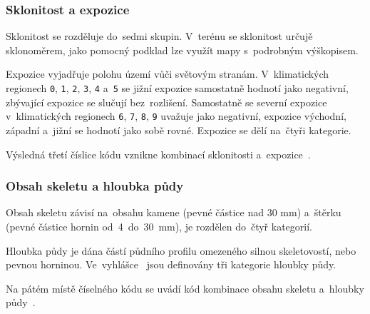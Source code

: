 \subsubsection{Sklonitost a expozice}
\label{sklonitost_expozice}

Sklonitost se rozděluje do~sedmi skupin. V~terénu se sklonitost určujě sklonoměrem, jako pomocný podklad lze využít mapy s~podrobným výškopisem.

Expozice vyjadřuje polohu území  vůči světovým stranám. V~klimatických regionech \texttt{0}, \texttt{1}, \texttt{2}, \texttt{3}, \texttt{4} a~\texttt{5} se jižní expozice samostatně hodnotí jako negativní, zbývající expozice se slučují bez~rozlišení. Samostatně se severní expozice v~klimatických regionech \texttt{6}, \texttt{7}, \texttt{8}, \texttt{9} uvažuje jako negativní, expozice východní, západní a~jižní se hodnotí jako sobě rovné. Expozice se dělí na~čtyři kategorie.

Výsledná třetí číslice kódu  vznikne kombinací sklonitosti a~expozice~\citep{vyhlaska_327}.

\subsubsection{Obsah skeletu a hloubka půdy}
\label{hloubka_pudy_obsah_skeletu}

Obsah skeletu závisí na~obsahu kamene (pevné částice nad 30 mm) a~štěrku (pevné částice hornin od~4~do~30~mm), je rozdělen do~čtyř kategorií.

Hloubka půdy je dána částí půdního profilu omezeného silnou skeletovostí, nebo pevnou horninou. Ve~vyhlášce~\citep{vyhlaska_327} jsou definovány tři kategorie hloubky půdy.

Na pátém místě číselného kódu  se uvádí kód kombinace obsahu skeletu a~hloubky půdy~\citep{vyhlaska_327}.
